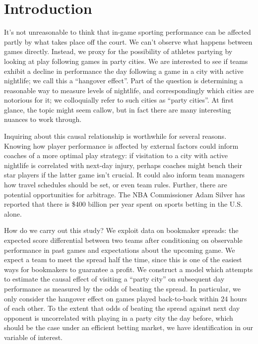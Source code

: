 \documentclass[letterpaper,12pt]{article}
\begin{document}

\section{Introduction}
It's not unreasonable to think that in-game sporting performance can be affected 
partly by what takes place off the court. 
We can't observe what happens between games directly. Instead, we proxy for the 
possibility of athletes partying by looking at play following games in party cities.
We are interested to see if 
teams exhibit a decline in performance the day following a game in a city 
with active nightlife; we call this a ``hangover effect''.
Part of the question is determining a reasonable way to measure
levels of nightlife, and correspondingly which cities are notorious for it; we colloquially refer to such cities as ``party cities''.
At first glance, the topic might seem callow, but in fact there are many interesting
nuances to work through.

Inquiring about this causal relationship is worthwhile for several reasons. 
Knowing how player performance is affected by external factors could inform coaches of a more
optimal play strategy: if visitation to a city with active nightlife is correlated with
next-day injury, perhaps coaches might bench their star players if the latter game isn't crucial.
It could also inform team managers how travel schedules should be set, or even team rules.
Further, there are potential opportunities for arbitrage.  The
NBA Commissioner Adam Silver has reported that there is \$400 billion per year spent 
on sports betting in the U.S. alone.\citep{asilver,cnnsilver} 

How do we carry out this study?
We exploit data on bookmaker spreads: the expected score 
differential between two teams after conditioning on observable performance in past games
and expectations about the upcoming game. 
We expect a team to meet the spread half the time, since this is one of the easiest ways for 
bookmakers to guarantee a profit.\citep{dubnerlevitt} We construct a model which attempts to 
estimate the causal effect of  visiting a ``party city'' on subsequent day 
performance as measured by the odds of beating the spread. In particular, we only consider the hangover effect 
on games played back-to-back within 24 hours of each other.
To the extent that odds of beating the spread against next day opponent 
is uncorrelated with playing in a party city the day before, which should be the case 
under an efficient betting market, we have identification in our variable of interest.
\end{document}
